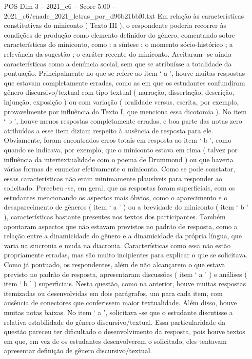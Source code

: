 \begin{textsample}{POS Dim 3 – 2021\_c6 – Score 5.00 – 2021\_c6/enade\_2021\_letras\_por\_d96b21bbf0.txt}
Em relação às características constitutivas do miniconto ( Texto III ), o respondente poderia recorrer às condições de produção como elemento definidor do gênero, comentando sobre características do miniconto, como : a síntese ; o momento sócio-histórico ; a relevância da sugestão ; o caráter recente do miniconto.
Aceitaram -se ainda características como a denúncia social, sem que se atribuísse a totalidade da pontuação.
Principalmente no que se refere ao item ‘ a ’, houve muitas respostas que estavam completamente erradas, como as em que os estudantes confundiram gênero discursivo/textual com tipo textual ( narração, dissertação, descrição, injunção, exposição ) ou com variação ( oralidade versus. escrita, por exemplo, provavelmente por influência do Texto I, que menciona essa dicotomia ).
No item ‘ b ’, houve menos respostas completamente erradas, e boa parte das notas zero atribuídas a esse item diziam respeito à ausência de resposta para ele.
Obviamente, foram encontrados erros totais em resposta ao item ‘ b ’, como quando se indicava, por exemplo, que o miniconto estava em rima ( talvez por influência da intertextualidade com o poema de Drummond ) ou que haveria várias formas de enunciar efetivamente o miniconto.
Como se pode constatar, essas características não eram minimamente plausíveis para responder ao solicitado.
Percebeu -se, em geral, que as respostas foram superficiais, com os estudantes mencionando os aspectos mais óbvios, como o aparecimento e o desaparecimento de gêneros ( item ‘ a ’ ) ou a brevidade do miniconto ( item ‘ b ’ ), características bastante presentes nos textos dos participantes.
Também apontaram aspectos que não estavam previstos no padrão de resposta, como a relação entre a dinamicidade do gênero e a dinamicidade da própria língua, que varia na sincronia e muda na diacronia.
Características como essa não estão propriamente erradas, mas são muito incipientes para explicar o que se solicitava.
Como já pontuado, os respondentes, além de não alcançarem o que estava previsto no padrão de resposta, apresentaram discussões ( item ‘ a ’ ) e análises ( item ‘ b ’ ) superficiais.
Nesta questão, como na anterior, houve muitas respostas itemizadas ou desenvolvidas em dois parágrafos, um para cada item, com ausência de conectores que conferissem maior textualidade.
Além disso, houve muitas notas baixas.
No item ‘ a ’, solicitava -se que o estudante discutisse a relativa estabilidade do gênero discursivo/textual.
Essa particularidade da questão pareceu ter dificultado o desenvolvimento da resposta, pois houve textos em que, em vez de os estudantes desenvolverem o solicitado, eles tentavam apresentar definição de gênero discursivo/textual.

\end{textsample}
